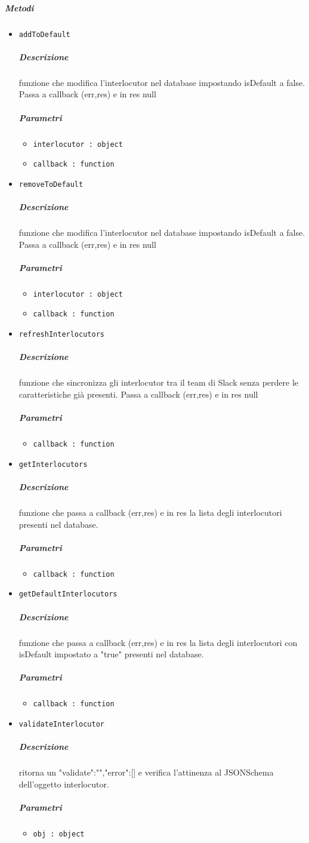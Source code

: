 \documentclass[../ManualeSviluppatore_v2.0.0.tex]{subfiles}
\begin{document}
\subparagraph{Metodi}\begin{itemize}
\item \texttt{addToDefault}
\subparagraph{Descrizione} funzione che modifica l'interlocutor nel database impostando isDefault a false. Passa a callback (err,res) e in res null
\subparagraph{Parametri} \begin{itemize}
\item \texttt{interlocutor : object}
\item \texttt{callback : function}
\end{itemize}
\item \texttt{removeToDefault}
\subparagraph{Descrizione} funzione che modifica l'interlocutor nel database impostando isDefault a false. Passa a callback (err,res) e in res null
\subparagraph{Parametri} \begin{itemize}
\item \texttt{interlocutor : object}
\item \texttt{callback : function}
\end{itemize}
\item \texttt{refreshInterlocutors}
\subparagraph{Descrizione} funzione che sincronizza gli interlocutor tra il team di Slack senza perdere le caratteristiche già presenti. Passa a callback (err,res) e in res null
\subparagraph{Parametri} \begin{itemize}
\item \texttt{callback : function}
\end{itemize}
\item \texttt{getInterlocutors}
\subparagraph{Descrizione} funzione che passa a callback (err,res) e in res la lista degli interlocutori presenti nel database.
\subparagraph{Parametri} \begin{itemize}
\item \texttt{callback : function}
\end{itemize}
\item \texttt{getDefaultInterlocutors}
\subparagraph{Descrizione} funzione che passa a callback (err,res) e in res la lista degli interlocutori con isDefault impostato a "true" presenti nel database.
\subparagraph{Parametri} \begin{itemize}
\item \texttt{callback : function}
\end{itemize}
\item \texttt{validateInterlocutor}
\subparagraph{Descrizione} ritorna un {"validate":"","error":[]} e verifica l'attinenza al JSONSchema dell'oggetto interlocutor.
\subparagraph{Parametri} \begin{itemize}
\item \texttt{obj : object}
\end{itemize}
\end{itemize}
\end{document}
